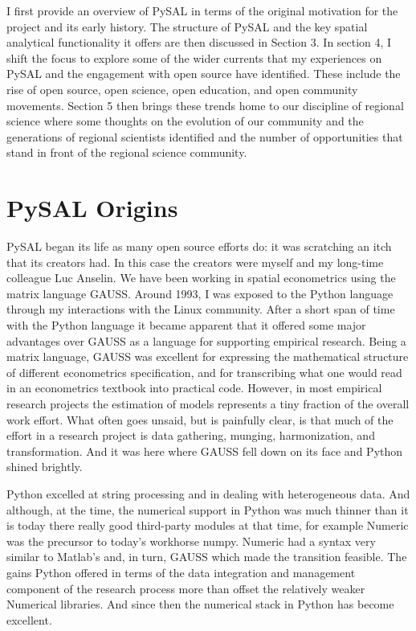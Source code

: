 \documentclass[11pt]{article}
\begin{document}
I first provide an overview of PySAL in terms of the original motivation for
the project and its early history. The structure of PySAL and the key spatial
analytical functionality it offers are then discussed in Section 3. In section
4, I shift the focus to explore some of the wider currents that my experiences
on PySAL and the engagement with open source have identified. These include the
rise of open source, open science, open education, and open community
movements. Section 5 then brings these trends home to our discipline of
regional science where some thoughts on the evolution of our community and the
generations of regional scientists identified and the number of opportunities
that stand in front of the regional science community.

\section*{PySAL Origins}
\label{sec:org5c752ab}
PySAL began its life as many open source efforts do: it was scratching
an itch that its creators had. In this case the creators were myself and my
long-time colleague Luc Anselin. We have been working in spatial econometrics
using the matrix language GAUSS. Around 1993, I was exposed to the Python
language through my interactions with the Linux community. After a short span of
time with the Python language it became apparent that it offered some major
advantages over GAUSS as a language for supporting empirical research. Being a
matrix language, GAUSS was excellent for expressing the mathematical structure
of different econometrics specification, and for transcribing what one would
read in an econometrics textbook into practical code. However, in most empirical
research projects the estimation of models represents a tiny fraction of the
overall work effort. What often goes unsaid, but is painfully clear, is that
much of the effort in a research project is data gathering, munging,
harmonization, and transformation. And it was here where GAUSS fell down on its
face and Python shined brightly.

Python excelled at string processing and in dealing with heterogeneous data.
And although, at the time, the numerical support in Python was much thinner
than it is today there really good third-party modules at that time, for
example Numeric was the precursor to today's workhorse numpy. Numeric had a
syntax very similar to Matlab's and, in turn, GAUSS which made the transition
feasible. The gains Python offered in terms of the data integration and management
component of the research process more than offset the relatively weaker
Numerical libraries. And since then the numerical stack in Python has become
excellent.
\end{document}
